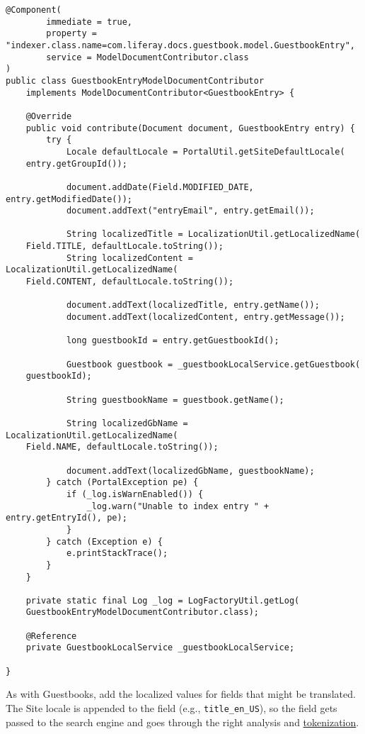 \begin{verbatim}
@Component(
        immediate = true,
        property = "indexer.class.name=com.liferay.docs.guestbook.model.GuestbookEntry",
        service = ModelDocumentContributor.class
)
public class GuestbookEntryModelDocumentContributor
    implements ModelDocumentContributor<GuestbookEntry> {

    @Override
    public void contribute(Document document, GuestbookEntry entry) {
        try {
            Locale defaultLocale = PortalUtil.getSiteDefaultLocale(
    entry.getGroupId());

            document.addDate(Field.MODIFIED_DATE, entry.getModifiedDate());
            document.addText("entryEmail", entry.getEmail());

            String localizedTitle = LocalizationUtil.getLocalizedName(
    Field.TITLE, defaultLocale.toString());
            String localizedContent = LocalizationUtil.getLocalizedName(
    Field.CONTENT, defaultLocale.toString());

            document.addText(localizedTitle, entry.getName());
            document.addText(localizedContent, entry.getMessage());

            long guestbookId = entry.getGuestbookId();

            Guestbook guestbook = _guestbookLocalService.getGuestbook(
    guestbookId);

            String guestbookName = guestbook.getName();

            String localizedGbName = LocalizationUtil.getLocalizedName(
    Field.NAME, defaultLocale.toString());

            document.addText(localizedGbName, guestbookName);
        } catch (PortalException pe) {
            if (_log.isWarnEnabled()) {
                _log.warn("Unable to index entry " + entry.getEntryId(), pe);
            }
        } catch (Exception e) {
            e.printStackTrace();
        }
    }

    private static final Log _log = LogFactoryUtil.getLog(
    GuestbookEntryModelDocumentContributor.class);

    @Reference
    private GuestbookLocalService _guestbookLocalService;

}
\end{verbatim}

As with Guestbooks, add the localized values for fields that might be
translated. The Site locale is appended to the field (e.g.,
\texttt{title\_en\_US}), so the field gets passed to the search engine
and goes through the right analysis and
\href{https://www.elastic.co/guide/en/elasticsearch/reference/7.x/analysis-tokenizers.html}{tokenization}.

